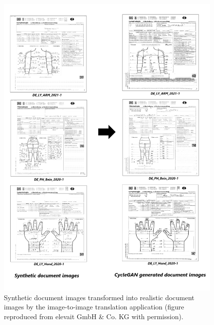 \begin{figure}[H]
        \begin{center}
	    \includegraphics[scale=0.30]{images/Evaluation/Qualitative_Results.png}
	    \caption[Synthetic document images transformed into realistic document images by the image-to-image translation application.]{Synthetic document images transformed into realistic document images by the image-to-image translation application (figure reproduced from elevait GmbH \& Co. KG with permission).}
	    \label{fig:QualitativeResults}
	    \end{center}
\end{figure}


